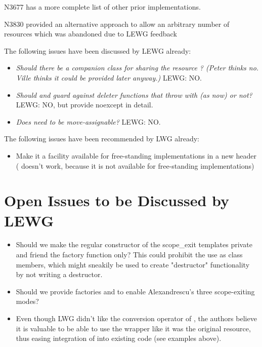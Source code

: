 \documentclass[ebook,11pt,article]{memoir}
\begin{document}
N3677 has a more complete list of other prior implementations.

N3830 provided an alternative approach to allow an arbitrary number of resources which was abandoned due to LEWG feedback 

The following issues have been discussed by LEWG already:
\begin{itemize}
\item \textit{Should there be a companion class for sharing the resource  ?  (Peter thinks no. Ville thinks it could be provided later anyway.) } LEWG: NO.
\item \textit{Should  and  guard against deleter functions that throw with  (as now) or not?} LEWG: NO, but provide noexcept in detail.
\item \textit{Does  need to be move-assignable? } LEWG: NO.
\end{itemize}

The following issues have been recommended by LWG already:
\begin{itemize}
\item Make it a facility available for free-standing implementations in a new header  ( doesn't work, because it is not available for free-standing implementations)
\end{itemize}


\section{Open Issues to be Discussed by LEWG}
\begin{itemize}
\item Should we make the regular constructor of the scope_exit templates private and friend the factory function only? This could prohibit the use as class members, which might sneakily be used to create "destructor" functionality by not writing a destructor.
\item Should we provide factories  and  to enable Alexandrescu's three scope-exiting modes?
\item Even though LWG didn't like the conversion operator of , the authors believe it is valuable to be able to use the wrapper like it was the original resource, thus easing integration of  into existing code (see examples above).
\end{itemize}
\end{document}
